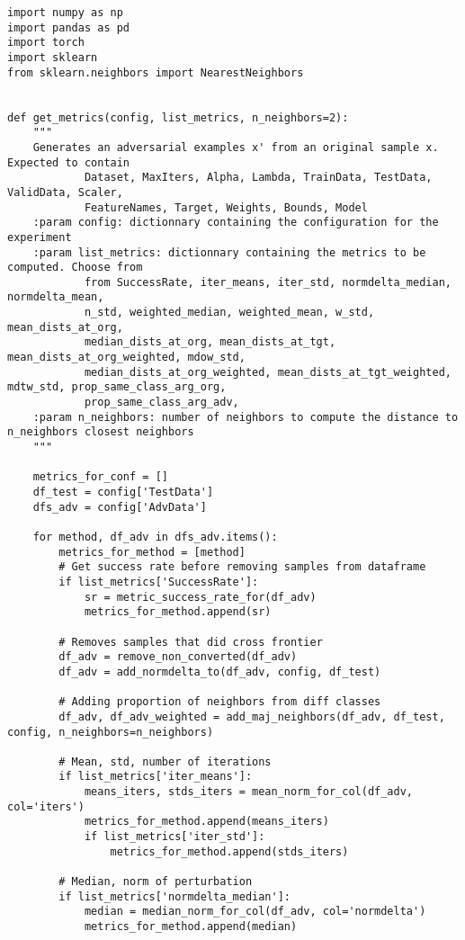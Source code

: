 \begin{lstlisting}[style=python, caption=評価指標の計算を行うMetrics.py]
import numpy as np
import pandas as pd
import torch
import sklearn
from sklearn.neighbors import NearestNeighbors


def get_metrics(config, list_metrics, n_neighbors=2):
    """
    Generates an adversarial examples x' from an original sample x. Expected to contain
            Dataset, MaxIters, Alpha, Lambda, TrainData, TestData, ValidData, Scaler,
            FeatureNames, Target, Weights, Bounds, Model
    :param config: dictionnary containing the configuration for the experiment
    :param list_metrics: dictionnary containing the metrics to be computed. Choose from
            from SuccessRate, iter_means, iter_std, normdelta_median, normdelta_mean,
            n_std, weighted_median, weighted_mean, w_std, mean_dists_at_org,
            median_dists_at_org, mean_dists_at_tgt, mean_dists_at_org_weighted, mdow_std,
            median_dists_at_org_weighted, mean_dists_at_tgt_weighted, mdtw_std, prop_same_class_arg_org,
            prop_same_class_arg_adv,
    :param n_neighbors: number of neighbors to compute the distance to n_neighbors closest neighbors
    """

    metrics_for_conf = []
    df_test = config['TestData']
    dfs_adv = config['AdvData']
    
    for method, df_adv in dfs_adv.items():
        metrics_for_method = [method]
        # Get success rate before removing samples from dataframe
        if list_metrics['SuccessRate']:
            sr = metric_success_rate_for(df_adv)
            metrics_for_method.append(sr)

        # Removes samples that did cross frontier
        df_adv = remove_non_converted(df_adv)        
        df_adv = add_normdelta_to(df_adv, config, df_test)

        # Adding proportion of neighbors from diff classes
        df_adv, df_adv_weighted = add_maj_neighbors(df_adv, df_test, config, n_neighbors=n_neighbors)            

        # Mean, std, number of iterations
        if list_metrics['iter_means']:
            means_iters, stds_iters = mean_norm_for_col(df_adv, col='iters')
            metrics_for_method.append(means_iters)
            if list_metrics['iter_std']:
                metrics_for_method.append(stds_iters)

        # Median, norm of perturbation
        if list_metrics['normdelta_median']:
            median = median_norm_for_col(df_adv, col='normdelta')
            metrics_for_method.append(median)


\end{lstlisting}
